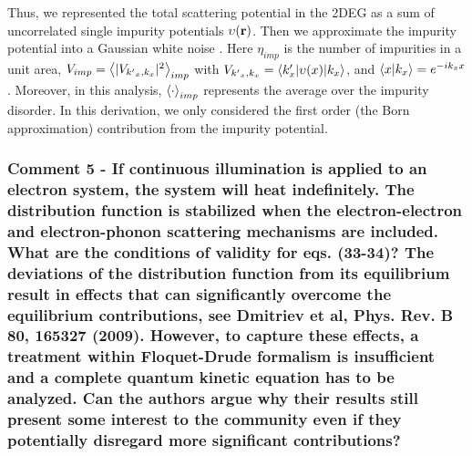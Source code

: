 \documentclass{article}
\begin{document}
\begin{itemize}
{  Thus, we represented the total scattering potential in the 2DEG as a sum of uncorrelated single impurity potentials $\upsilon(\vb{r})$. Then we  approximate the impurity potential into a Gaussian white noise \cite{akkermans10,wackerl20}.
  Here $\eta_{imp}$ is the number of impurities in a unit area, $V_{imp} = \expval{|V_{{k'}_x,k_x}|^2}_{imp}$ with $V_{{k'}_x,k_x} = \mel**{k'_x}{\upsilon(x) }{k_x}$, and $\braket{x}{k_x} = e^{-ik_x x}$.
  Moreover, in this analysis, $\expval{\cdot}_{imp}$ represents the average over the impurity disorder. In this derivation, we only considered the first order (the Born approximation) contribution from the impurity potential.
  }
\end{itemize}

\subsubsection*{Comment 5 -
\color{RoyalBlue} If continuous illumination is applied to an electron system, the system will heat indefinitely. The distribution function is stabilized when the electron-electron and electron-phonon scattering mechanisms are included. What are the conditions of validity for eqs. (33-34)? The deviations of the distribution function from its equilibrium result in effects that can significantly overcome the equilibrium contributions, see Dmitriev et al, Phys. Rev. B 80, 165327 (2009). However, to capture these effects, a treatment within Floquet-Drude formalism is insufficient and a complete quantum kinetic equation has to be analyzed. Can the authors argue why their results still present some interest to the community even if they potentially disregard more significant contributions?
}
\end{document}

